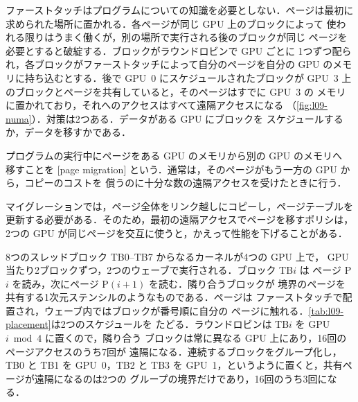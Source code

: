 \documentclass[../main.tex]{subfiles}
\begin{document}
ファーストタッチはプログラムについての知識を必要としない．ページは最初に
求められた場所に置かれる．各ページが同じ GPU 上のブロックによって
使われる限りはうまく働くが，別の場所で実行される後のブロックが同じ
ページを必要とすると破綻する．ブロックがラウンドロビンで GPU ごとに
1つずつ配られ，各ブロックがファーストタッチによって自分のページを自分の
GPU のメモリに持ち込むとする．後で GPU~0 にスケジュールされたブロックが
GPU~3 上のブロックとページを共有していると，そのページはすでに GPU~3 の
メモリに置かれており，それへのアクセスはすべて遠隔アクセスになる
（\cref{fig:l09-numa}）．対策は2つある．データがある GPU にブロックを
スケジュールするか，データを移すかである．

\begin{definition}[ページマイグレーション]
  プログラムの実行中にページをある GPU のメモリから別の GPU のメモリへ
  移すことを
  [page migration]
  という．通常は，そのページがもう一方の GPU から，コピーのコストを
  償うのに十分な数の遠隔アクセスを受けたときに行う．
\end{definition}

%
マイグレーションでは，ページ全体をリンク越しにコピーし，ページテーブルを
更新する必要がある．そのため，最初の遠隔アクセスでページを移すポリシは，
2つの GPU が同じページを交互に使うと，かえって性能を下げることがある．

\begin{example}[ラウンドロビンとグループ化したブロックスケジューリング]
  \label{ex:l09-placement}
  8つのスレッドブロック TB0--TB7 からなるカーネルが4つの GPU 上で，
  GPU 当たり2ブロックずつ，2つのウェーブで実行される．ブロック TB$i$ は
  ページ P$i$ を読み，次にページ P$(i{+}1)$ を読む．隣り合うブロックが
  境界のページを共有する1次元ステンシルのようなものである．ページは
  ファーストタッチで配置され，ウェーブ内ではブロックが番号順に自分の
  ページに触れる．\cref{tab:l09-placement}は2つのスケジュールを
  たどる．ラウンドロビンは TB$i$ を GPU $i \bmod 4$ に置くので，隣り合う
  ブロックは常に異なる GPU 上にあり，16回のページアクセスのうち7回が
  遠隔になる．連続するブロックをグループ化し，TB0 と TB1 を GPU~0，TB2 と
  TB3 を GPU~1，というように置くと，共有ページが遠隔になるのは2つの
  グループの境界だけであり，16回のうち3回になる．
\end{example}
\end{document}
